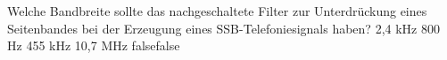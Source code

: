     {Welche Bandbreite sollte das nachgeschaltete Filter zur Unterdrückung eines Seitenbandes bei der Erzeugung eines SSB-Telefoniesignals haben?}
    {2,4 kHz }
    {800 Hz }
    {455 kHz }
    {10,7 MHz }
    {false}{false}